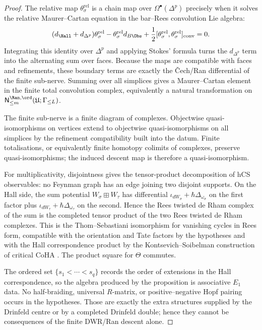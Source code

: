 \begin{proof}
The relative map $\theta_\sigma^{\mathrm{rel}}$ is a chain map over
$\Omega^\bullet(\Delta^p)$ precisely when it solves the relative
Maurer--Cartan equation in the bar--Rees convolution Lie algebra:
\[
 (d_{\Hall}+d_{\Delta^p})\theta_\sigma^{\mathrm{rel}}
 -\theta_\sigma^{\mathrm{rel}}d_{B\Obs}
 +\frac{1}{2}
 [\theta_\sigma^{\mathrm{rel}},\theta_\sigma^{\mathrm{rel}}]_{\mathrm{conv}}
 =0.
\]
Integrating this identity over $\Delta^p$ and applying Stokes' formula
turns the $d_{\Delta^p}$ term into the alternating sum over faces.
Because the maps are compatible with faces and refinements, these
boundary terms are exactly the \v{C}ech/Ran differential of the finite
sub-nerve. Summing over all simplices gives a Maurer--Cartan element in
the finite total convolution complex, equivalently a natural
transformation on
$\mathsf N^{\Ran,\ord}_{\le m}(\mathfrak U;\Gamma_{\le L})$.

The finite sub-nerve is a finite diagram of complexes. Objectwise
quasi-isomorphisms on vertices extend to objectwise quasi-isomorphisms
on all simplices by the refinement compatibility built into the datum.
Finite totalisations, or equivalently finite homotopy colimits of
complexes, preserve quasi-isomorphisms; the induced descent map is
therefore a quasi-isomorphism.

For multiplicativity, disjointness gives the tensor-product
decomposition of hCS observables: no Feynman graph has an edge joining
two disjoint supports. On the Hall side, the sum potential
$W_\sigma\boxplus W_\tau$ has differential
$\iota_{dW_\sigma}+\hbar\Delta_{\omega_\sigma}$ on the first factor
plus $\iota_{dW_\tau}+\hbar\Delta_{\omega_\tau}$ on the second. Hence
the Rees twisted de Rham complex of the sum is the completed tensor
product of the two Rees twisted de Rham complexes. This is the
Thom--Sebastiani isomorphism for vanishing cycles in Rees form,
compatible with the orientation and Tate factors by the hypotheses
and with the Hall correspondence product by the
Kontsevich--Soibelman construction of critical CoHA
\cite{KS2008}. The product square for $\Theta$ commutes.

The ordered set $\{s_1<\cdots<s_q\}$ records the order of extensions in
the Hall correspondence, so the algebra produced by the proposition is
associative $E_1$ data. No half-braiding, universal $R$-matrix, or
positive--negative Hopf pairing occurs in the hypotheses. Those are
exactly the extra structures supplied by the Drinfeld centre or by a
completed Drinfeld double; hence they cannot be consequences of the
finite DWR/Ran descent alone.
\end{proof}

